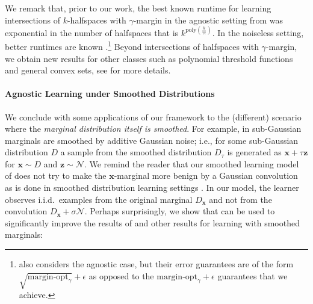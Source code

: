 \documentclass[10pt,a4paper]{article}
\renewcommand\vec[1]{\mathbf{#1}}
\newcommand{\normal}{\mathcal{N}}
\newcommand{\eps}{\epsilon}
\newcommand{\poly}{\mathrm{poly}}
\newcommand{\1}{\Ind}
\newcommand{\x}{\vec x}
\begin{document}
We remark that, prior to our work, the best known runtime for learning intersections of
$k$-halfspaces with $\gamma$-margin in the agnostic setting from \cite{ArriagaVempala:99}
was exponential in the number of halfspaces that is $k^{\poly(\frac{k}{\gamma \eps})}$.  
In the noiseless setting, better runtimes are known \cite{klivans-servedio-margin,Gottlieb_margin,goel2019learning}.\footnote{\cite{goel2019learning} also considers the agnostic case, but their error guarantees are of the form $\sqrt{\mathrm{margin}\text{-}\mathrm{opt}_\gamma} + \eps$ as opposed to the $\mathrm{margin}\text{-}\mathrm{opt}_\gamma+\epsilon$ guarantees that we achieve.}
Beyond intersections of halfspaces with $\gamma$-margin, we obtain new results for other 
classes such as polynomial threshold functions and general convex sets, see  
for more details.






\paragraph{Agnostic Learning under Smoothed Distributions}
We conclude with some applications of our framework to the (different) scenario where the {\em marginal distribution itself is smoothed}.
For example, in \cite{Kane2013LearningHalfspacesLogConcave} sub-Gaussian marginals are smoothed by additive 
Gaussian noise; i.e., for some sub-Gaussian distribution $D$ a sample from 
the smoothed distribution $D_\tau$ is generated as $\x + \tau \vec z$ for $\x \sim D$
and $\vec z \sim \normal$.  
We remind the reader that our smoothed learning model of  does not try to make the $\x$-marginal more benign by a Gaussian convolution as is done in smoothed distribution learning settings \cite{kalai2008decision,kalai2009learning,Kane2013LearningHalfspacesLogConcave}.  In our model, the learner observes i.i.d.\ examples from the original marginal $D_\x$ and not 
from the convolution $D_\x + \sigma \normal$.  
Perhaps surprisingly, we show that  can be used to significantly improve the results of \cite{Kane2013LearningHalfspacesLogConcave} and other results for learning with smoothed marginals:
\end{document}
